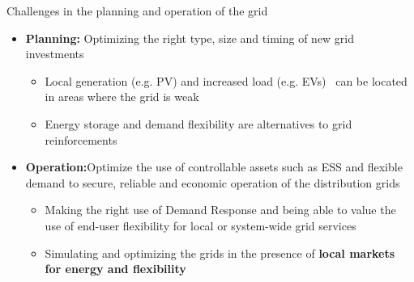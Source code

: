 \documentclass{beamer}
\begin{document}
\begin{frame}{Challenges in the planning and operation of the grid}
\begin{itemize}
\item \textbf{Planning:} Optimizing the right type, size and timing of new grid investments
\begin{itemize}
\item Local generation (e.g. PV) and increased load (e.g. EVs)  can be located in areas where the grid is weak
\item Energy storage and demand flexibility are alternatives to grid reinforcements
\end{itemize}

\item \textbf{Operation:}Optimize the use of controllable assets such as ESS and flexible demand to secure, reliable and economic operation of the distribution grids
\begin{itemize}
\item Making the right use of Demand Response and being able to value the use of end-user flexibility for local or system-wide grid services
\item Simulating and optimizing the grids in the presence of \textbf{local markets for energy and flexibility}
\end{itemize}
\end{itemize}
\end{frame}
\end{document}
